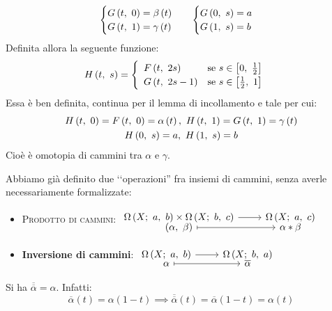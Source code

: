 \begin{demonstration}
\begin{itemize}
\begin{equation*}
\begin{array}{ll}
		\begin{cases}
			G\left(t,\ 0\right)=\beta\left(t\right)\\
			G\left(t,\ 1\right)=\gamma\left(t\right)
		\end{cases}&
	\begin{cases}
			G\left(0,\ s\right)=a\\
			G\left(1,\ s\right)=b
	\end{cases}
	\end{array}
\end{equation*}
Definita allora la seguente funzione:
\begin{equation*}
	\mvf{H}{t}{s}=\begin{cases}
		\begin{array}{ll}
			\mvf{F}{t}{2s}&\text{se }s\in\left[0,\ \frac{1}{2}\right]\\
			\mvf{G}{t}{2s-1}&\text{se }s\in\left[\frac{1}{2},\ 1\right]
		\end{array}
	\end{cases}
\end{equation*}
Essa è ben definita, continua per il lemma di incollamento e tale per cui:
\begin{gather*}
	\mvf{H}{t}{0}=\mvf{F}{t}{0}=\alpha\left(t\right),\ \mvf{H}{t}{1}=\mvf{G}{t}{1}=\gamma\left(t\right)\\
	\mvf{H}{0}{s}=a,\ \mvf{H}{1}{s}=b
\end{gather*}
		Cioè è omotopia di cammini tra $\alpha$ e $\gamma$.
	\end{itemize}
\end{demonstration}
\begin{remember}
Abbiamo già definito due ‘‘operazioni'' fra insiemi di cammini, senza averle necessariamente formalizzate:
\begin{itemize}
\item \textsc{Prodotto di cammini}: $\funztot{\ }{\inscam{X}{a}{b}\times\inscam{X}{b}{c}}{\inscam{X}{a}{c}}{\left(\alpha,\ \beta\right)}{\alpha\ast\beta}$
\item \textbf{Inversione di cammini}: $\funztot{\ }{\inscam{X}{a}{b}}{\inscam{X}{b}{a}}{\alpha}{\overline{\alpha}}$
\end{itemize}
\end{remember}
\begin{observe}
Si ha $\overline{\overline{\alpha}}=\alpha$. Infatti:
\begin{equation*}
	\overline{\alpha}\left(t\right)=\alpha\left(1-t\right)\implies\overline{\overline{\alpha}}\left(t\right)=\overline{\alpha}\left(1-t\right)=\alpha\left(t\right)
\end{equation*}
\vspace{-6mm}
\end{observe}
